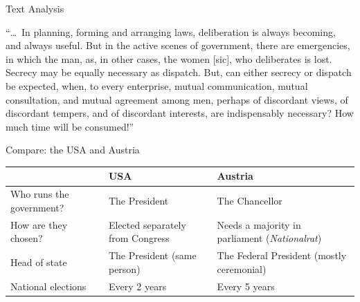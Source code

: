 \documentclass[aspectratio=169,11pt]{beamer}
\begin{document}
\begin{frame}{Text Analysis}
  \vspace{0.3em}
  \begin{textquote}[fontupper=\itshape\small]
    ``\ldots\ In planning, forming and arranging laws, deliberation is always becoming, and always useful. But in the active scenes of government, there are emergencies, in which the man, as, in other cases, the women [sic], who deliberates is lost. Secrecy may be equally necessary as dispatch. But, can either secrecy or dispatch be expected, when, to every enterprise, mutual communication, mutual consultation, and mutual agreement among men, perhaps of discordant views, of discordant tempers, and of discordant interests, are indispensably necessary? How much time will be consumed!''
  \end{textquote}
\end{frame}

\begin{frame}{Compare: the USA and Austria}
  \centering
  \renewcommand{\arraystretch}{1.5}
  \begin{tabular}{@{}>{\raggedright\arraybackslash}p{}>{\raggedright\arraybackslash}p{}>{\raggedright\arraybackslash}p{}@{}}
    \toprule
    & \textbf{\color{oldblue}USA} & \textbf{\color{oldred}Austria} \\
    \midrule
    Who runs the government? & The President & The Chancellor \\
    How are they chosen? & Elected separately from Congress & Needs a majority in parliament (\emph{Nationalrat}) \\
    Head of state & The President (same person) & The Federal President (mostly ceremonial) \\
    National elections & Every 2 years & Every 5 years \\
    \bottomrule
  \end{tabular}
\end{frame}
\end{document}
